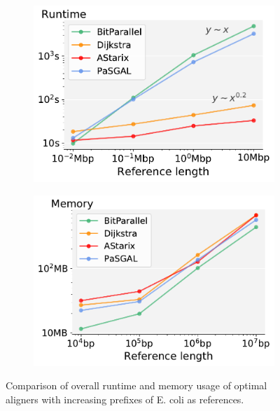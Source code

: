 \begin{figure}[t]
  \begin{subfigure}{.49\textwidth}
    \centering
    \includegraphics[width=\linewidth]{figs/cmp/performance_vs_genomesize-head_Mbpxs.pdf}
  \end{subfigure}
  \begin{subfigure}{.49\textwidth}
    \centering
    \includegraphics[width=\linewidth]{figs/cmp/memory_vs_genomesize-headxmax_rss.pdf}
  \end{subfigure}
  \caption{Comparison of overall runtime and memory usage of optimal aligners
     with increasing prefixes of E. coli as references.}
  \label{fig:scaling_with_graphsize}
\end{figure}
